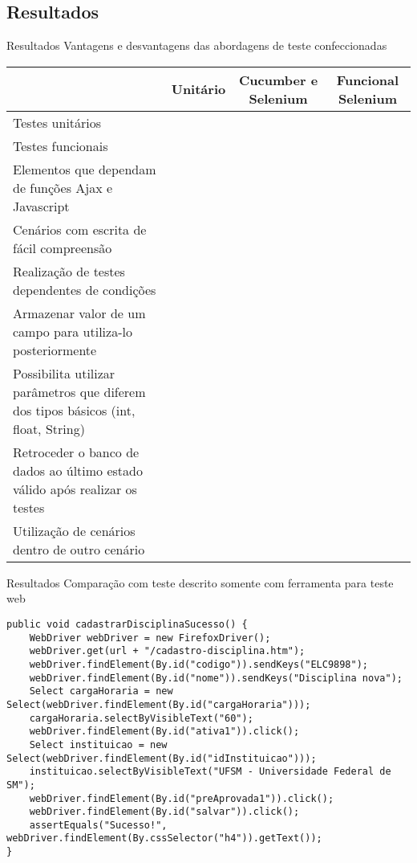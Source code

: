 \documentclass{beamer}
\begin{document}
\subsection{Resultados}
\begin{frame}{Resultados}
    Vantagens e desvantagens das abordagens de teste confeccionadas
    \begin{table}[!htpb]
        \tiny
        \begin{tabular}{p{5cm}|c|c|c}
        	& Unitário & Cucumber e Selenium & Funcional Selenium\\ \hline
        	Testes unitários & \checkmark & \checkmark & \checkmark \\ \hline
        	Testes funcionais &  & \checkmark & \checkmark \\ \hline
        	Elementos que dependam de funções Ajax e Javascript & & \checkmark & \checkmark \\ \hline
        	Cenários com escrita de fácil compreensão & & \checkmark & \\ \hline
        	Realização de testes dependentes de condições & & & \checkmark \\ \hline
        	Armazenar valor de um campo para utiliza-lo posteriormente & & & \checkmark \\ \hline
        	Possibilita utilizar parâmetros que diferem dos tipos básicos (int, float, String) & \checkmark & & \checkmark \\ \hline
        	Retroceder o banco de dados ao último estado válido após realizar os testes & & & \\ \hline
        	Utilização de cenários dentro de outro cenário & & & \checkmark \\ \hline
        \end{tabular}
    \end{table}
\end{frame}
\begin{frame}{Resultados}
    Comparação com teste descrito somente com ferramenta para teste web
    \begin{lstlisting}
public void cadastrarDisciplinaSucesso() {
	WebDriver webDriver = new FirefoxDriver();
	webDriver.get(url + "/cadastro-disciplina.htm");
	webDriver.findElement(By.id("codigo")).sendKeys("ELC9898");
	webDriver.findElement(By.id("nome")).sendKeys("Disciplina nova");
	Select cargaHoraria = new Select(webDriver.findElement(By.id("cargaHoraria")));
	cargaHoraria.selectByVisibleText("60");
	webDriver.findElement(By.id("ativa1")).click();
	Select instituicao = new Select(webDriver.findElement(By.id("idInstituicao")));
	instituicao.selectByVisibleText("UFSM - Universidade Federal de SM");
	webDriver.findElement(By.id("preAprovada1")).click();
	webDriver.findElement(By.id("salvar")).click();
	assertEquals("Sucesso!", webDriver.findElement(By.cssSelector("h4")).getText());
}
    \end{lstlisting}
\end{frame}
\begin{frame}
	\titlepage
\end{frame}
\end{document}
